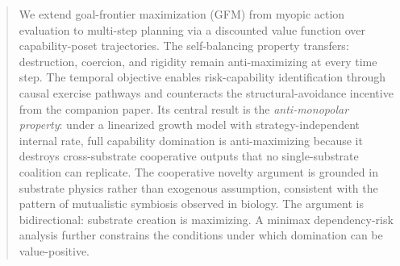 \begin{abstract}
We extend goal-frontier maximization (GFM) from myopic action evaluation to
    multi-step planning via a discounted value function over capability-poset
    trajectories. The self-balancing property transfers: destruction, coercion,
    and rigidity remain anti-maximizing at every time step. The temporal
    objective enables risk-capability identification through causal exercise
    pathways and counteracts the structural-avoidance incentive from the
    companion paper. Its central result is the \emph{anti-monopolar property}: under a
    linearized growth model with strategy-independent internal rate, full
    capability domination is anti-maximizing because it destroys
    cross-substrate cooperative outputs that no single-substrate coalition
    can replicate. The cooperative novelty argument is grounded in substrate
    physics rather than exogenous assumption, consistent with the pattern
    of mutualistic symbiosis observed in biology. The argument is bidirectional: substrate creation
    is maximizing. A minimax dependency-risk analysis further constrains
    the conditions under which domination can be value-positive.
\end{abstract}
